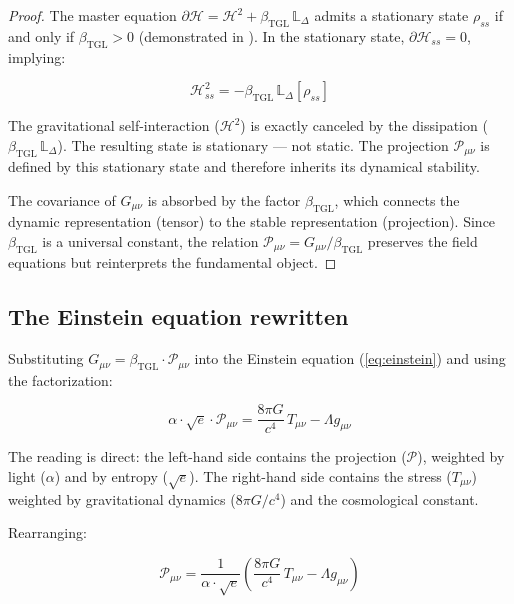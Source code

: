 \documentclass[12pt,a4paper,twoside]{article}
\newcommand{\betatgl}{\beta_{\!\scriptscriptstyle\mathrm{TGL}}}
\begin{document}
\begin{proof}
The master equation $\partial\mathcal{H} = \mathcal{H}^2 + \betatgl\,\mathbb{L}_\Delta$ admits a stationary state $\rho_{ss}$ if and only if $\betatgl > 0$ (demonstrated in \cite{Miguel2025Alpha2}). In the stationary state, $\partial\mathcal{H}_{ss} = 0$, implying:

\begin{equation}
\mathcal{H}_{ss}^2 = -\betatgl\,\mathbb{L}_\Delta[\rho_{ss}]
\end{equation}

The gravitational self-interaction ($\mathcal{H}^2$) is exactly canceled by the dissipation ($\betatgl\,\mathbb{L}_\Delta$). The resulting state is stationary --- not static. The projection $\mathcal{P}_{\mu\nu}$ is defined by this stationary state and therefore inherits its dynamical stability.

The covariance of $G_{\mu\nu}$ is absorbed by the factor $\betatgl$, which connects the dynamic representation (tensor) to the stable representation (projection). Since $\betatgl$ is a universal constant, the relation $\mathcal{P}_{\mu\nu} = G_{\mu\nu}/\betatgl$ preserves the field equations but reinterprets the fundamental object.
\end{proof}


\subsection{The Einstein equation rewritten}

Substituting $G_{\mu\nu} = \betatgl \cdot \mathcal{P}_{\mu\nu}$ into the Einstein equation (\ref{eq:einstein}) and using the factorization:

\begin{equationbox}[title={Einstein Equation in TGL}]
\begin{equation}
\boxed{\alpha \cdot \sqrt{e} \cdot \mathcal{P}_{\mu\nu} = \frac{8\pi G}{c^4}\, T_{\mu\nu} - \Lambda g_{\mu\nu}}
\label{eq:einstein_tgl}
\end{equation}
\end{equationbox}

The reading is direct: the left-hand side contains the projection ($\mathcal{P}$), weighted by light ($\alpha$) and by entropy ($\sqrt{e}$). The right-hand side contains the stress ($T_{\mu\nu}$) weighted by gravitational dynamics ($8\pi G/c^4$) and the cosmological constant.

Rearranging:

\begin{equation}
\mathcal{P}_{\mu\nu} = \frac{1}{\alpha \cdot \sqrt{e}} \left(\frac{8\pi G}{c^4}\, T_{\mu\nu} - \Lambda g_{\mu\nu}\right)
\end{equation}
\end{document}
